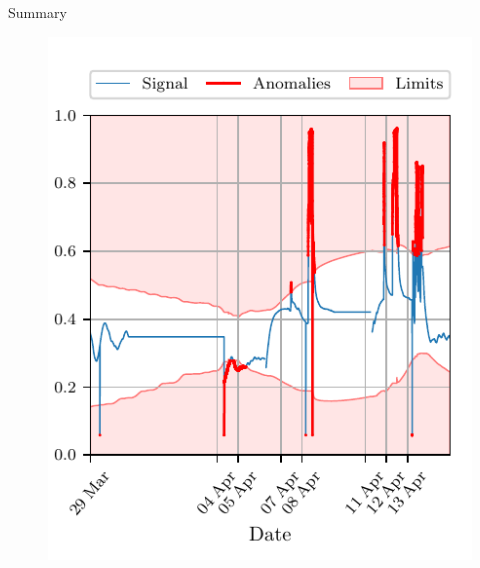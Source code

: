 \documentclass[aspectratio=169]{beamer}
\makeatletter
\def\beamer@writeslidentry@miniframesoff{%
  \expandafter\beamer@ifempty\expandafter{\beamer@framestartpage}{}%
  {%
    \clearpage\beamer@notesactions%
  }
}
\newcommand*{\miniframesoff}{\let\beamer@writeslidentry=\beamer@writeslidentry@miniframesoff}
\makeatother
\begin{document}
\begin{frame}{Summary}
\begin{minipage}{0.38\linewidth}
\begin{figure}[htpb]
\begin{center}
                \includegraphics[width=1\linewidth]{../ilustrate/pc2023/inverter/half_Inverter_Temperature_sliding_thresh.pdf}
            \end{center}
        \end{figure}
    \end{minipage}
    

\end{frame}

\miniframesoff
\end{document}
